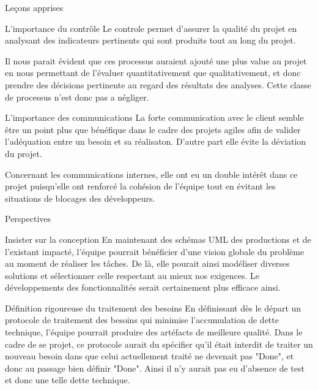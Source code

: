 \documentclass[]{article}
\begin{document}
{\begin{section}{Leçons apprises}
 \begin{subsection}{L'importance du contrôle}
    Le controle permet d'assurer la qualité du projet en analysant des indicateurs pertinents qui sont produits tout au long du projet.
    
    Il nous parait évident que ces processus auraient ajouté une plus value au projet en nous permettant de l'évaluer quantitativement que qualitativement, et donc prendre des décisions pertinente au regard des résultats des analyses. Cette classe de processus n'est donc pas a négliger.
 \end{subsection}

 \begin{subsection}{L'importance des communications}
    La forte communication avec le client semble être un point plus que bénéfique dans le cadre des projets agiles afin de valider l'adéquation entre un besoin et sa réalisaton. D'autre part elle évite la déviation du projet.

    Concernant les communications internes, elle ont eu un double intérêt dans ce projet puisqu'elle ont renforcé la cohésion de l'équipe tout en évitant les situations de blocages des développeurs.
 \end{subsection}
\end{section}

\begin{section}{Perspectives}
 \begin{subsection}{Insister sur la conception}
     En maintenant des schémas UML des productions et de l'existant impacté, l'équipe pourrait bénéficier d'une vision globale du problème au moment de réaliser les tâches. De là, elle pourait ainsi modéliser diverses solutions et sélectionner celle respectant au mieux nos exigences. Le développements des fonctionnalités serait certainement plus efficace ainsi.
 \end{subsection}

 \begin{subsection}{Définition rigoureuse du traitement des besoins}
    En définissant dès le départ un protocole de traitement des besoins qui minimise l'accumulation de dette technique, l'équipe pourrait produire des artéfacts de meilleure qualité. Dans le cadre de se projet, ce protocole aurait du spécifier qu'il était interdit de traiter un nouveau besoin dans que celui actuellement traité ne devenait pas "Done", et donc au passage bien définir "Done". Ainsi il n'y aurait pas eu d'absence de test et donc une telle dette technique.
 \end{subsection}


\end{section}}
\end{document}
